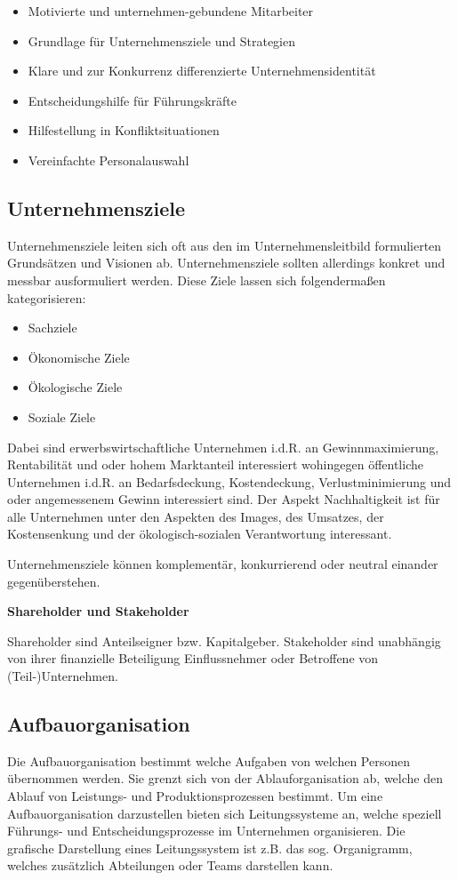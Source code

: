 \begin{itemize}
    \item Motivierte und unternehmen-gebundene Mitarbeiter
    \item Grundlage für Unternehmensziele und Strategien
    \item Klare und zur Konkurrenz differenzierte Unternehmensidentität
    \item Entscheidungshilfe für Führungskräfte
    \item Hilfestellung in Konfliktsituationen
    \item Vereinfachte Personalauswahl
\end{itemize}

\subsection{Unternehmensziele}
Unternehmensziele leiten sich oft aus den im Unternehmensleitbild formulierten Grundsätzen und Visionen ab. Unternehmensziele sollten allerdings konkret und messbar ausformuliert werden. Diese Ziele lassen sich folgendermaßen kategorisieren:

\begin{itemize}
    \item Sachziele
    \item Ökonomische Ziele
    \item Ökologische Ziele
    \item Soziale Ziele
\end{itemize}

Dabei sind erwerbswirtschaftliche Unternehmen i.d.R. an Gewinnmaximierung, Rentabilität und oder hohem Marktanteil interessiert wohingegen öffentliche Unternehmen i.d.R. an Bedarfsdeckung, Kostendeckung, Verlustminimierung und oder angemessenem Gewinn interessiert sind. Der Aspekt Nachhaltigkeit ist für alle Unternehmen unter den Aspekten des Images, des Umsatzes, der Kostensenkung und der ökologisch-sozialen Verantwortung interessant.

Unternehmensziele können komplementär, konkurrierend oder neutral einander gegenüberstehen.

\textbf{Shareholder und Stakeholder}

Shareholder sind Anteilseigner bzw. Kapitalgeber. Stakeholder sind unabhängig von ihrer finanzielle Beteiligung Einflussnehmer oder Betroffene von (Teil-)Unternehmen.

\subsection{Aufbauorganisation}
Die Aufbauorganisation bestimmt welche Aufgaben von welchen Personen übernommen werden. Sie grenzt sich von der Ablauforganisation ab, welche den Ablauf von Leistungs- und Produktionsprozessen bestimmt. Um eine Aufbauorganisation darzustellen bieten sich Leitungssysteme an, welche speziell Führungs- und Entscheidungsprozesse im Unternehmen organisieren. Die grafische Darstellung eines Leitungssystem ist z.B. das sog. Organigramm, welches zusätzlich Abteilungen oder Teams darstellen kann.

